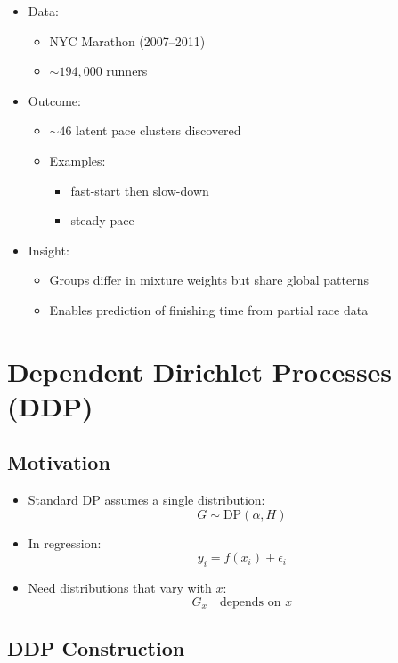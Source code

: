 \documentclass[12pt,oneside]{book}
\numberwithin{equation}{section}
\theoremstyle{definition}
\theoremstyle{plain}
\theoremstyle{remark}
\begin{document}
\begin{itemize}
\item Data:
\begin{itemize}
\item NYC Marathon (2007--2011)
\item $\sim 194{,}000$ runners
\end{itemize}

\item Outcome:
\begin{itemize}
\item $\sim 46$ latent pace clusters discovered
\item Examples:
\begin{itemize}
\item fast-start then slow-down
\item steady pace
\end{itemize}
\end{itemize}

\item Insight:
\begin{itemize}
\item Groups differ in mixture weights but share global patterns
\item Enables prediction of finishing time from partial race data
\end{itemize}
\end{itemize}

\section{Dependent Dirichlet Processes (DDP)}

\subsection*{Motivation}

\begin{itemize}
\item Standard DP assumes a single distribution:
\[
G \sim \text{DP}(\alpha, H)
\]

\item In regression:
\[
y_i = f(x_i) + \epsilon_i
\]

\item Need distributions that vary with $x$:
\[
G_x \quad \text{depends on } x
\]
\end{itemize}

\subsection*{DDP Construction}
\end{document}

